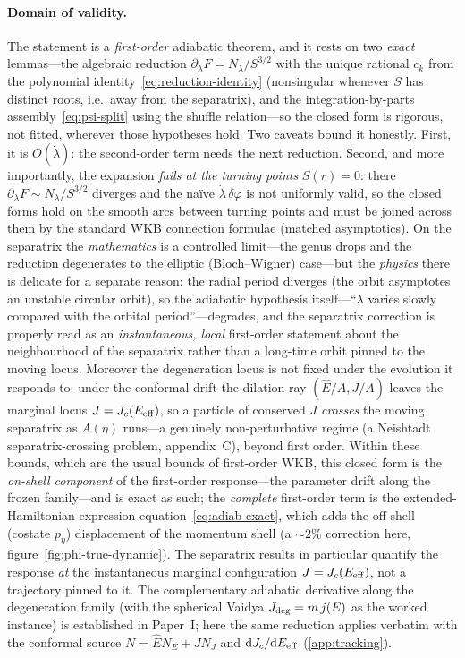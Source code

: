 \documentclass[12pt]{iopart}
\theoremstyle{plain}
\theoremstyle{definition}
\theoremstyle{remark}
\newcommand{\Ehat}{\hat E}
\newcommand{\Jc}{J_{c}}
\newcommand{\dd}{\mathrm{d}}
\begin{document}
\paragraph{Domain of validity.} The statement is a \emph{first-order} adiabatic
theorem, and it rests on two \emph{exact} lemmas---the algebraic reduction
$\partial_\lambda F=N_\lambda/S^{3/2}$ with the unique rational $c_k$ from the
polynomial identity~\eqref{eq:reduction-identity} (nonsingular whenever $S$ has
distinct roots, i.e.\ away from the separatrix), and the integration-by-parts
assembly~\eqref{eq:psi-split} using the shuffle relation---so the closed form is
rigorous, not fitted, wherever those hypotheses hold. Two caveats bound it honestly.
First, it is $O(\dot\lambda)$: the second-order term needs the next reduction.
Second, and more importantly, the expansion \emph{fails at the turning points}
$S(r)=0$: there $\partial_\lambda F\sim N_\lambda/S^{3/2}$ diverges and the na\"ive
$\dot\lambda\,\delta\varphi$ is not uniformly valid, so the closed forms hold on the
smooth arcs between turning points and must be joined across them by the standard WKB
connection formulae (matched asymptotics). On the separatrix the \emph{mathematics}
is a controlled limit---the genus drops and the reduction degenerates to the elliptic
(Bloch--Wigner) case---but the \emph{physics} there is delicate for a separate reason:
the radial period diverges (the orbit asymptotes an unstable circular orbit), so the
adiabatic hypothesis itself---``$\lambda$ varies slowly compared with the orbital
period''---degrades, and the separatrix correction is properly read as an
\emph{instantaneous, local} first-order statement about the neighbourhood of the
separatrix rather than a long-time orbit pinned to the moving locus. Moreover the degeneration
locus is not fixed under the evolution it responds to: under the conformal drift the
dilation ray $(\Ehat/A,J/A)$ leaves the marginal locus $J=\Jc(E_{\rm eff})$, so a
particle of conserved $J$ \emph{crosses} the moving separatrix as $A(\eta)$ runs---a
genuinely non-perturbative regime (a Neishtadt separatrix-crossing problem, appendix~C),
beyond first order. Within these bounds, which
are the usual bounds of first-order WKB, this closed form is the \emph{on-shell
component} of the first-order response---the parameter drift along the frozen
family---and is exact as such; the \emph{complete} first-order term is the
extended-Hamiltonian expression equation~\eqref{eq:adiab-exact}, which adds the
off-shell (costate $p_\eta$) displacement of the momentum shell (a $\sim2\%$
correction here, figure~\ref{fig:phi-true-dynamic}). The separatrix results in particular
quantify the response \emph{at} the instantaneous marginal configuration
$J=\Jc(E_{\rm eff})$, not a trajectory pinned to it. The complementary
adiabatic derivative along the degeneration family
(with the spherical Vaidya $J_{\rm deg}=m\,j(E)$ as the worked instance) is established
in Paper~I; here the same reduction applies verbatim with the conformal source
$N=\Ehat N_E+J N_J$ and $\dd\Jc/\dd E_{\rm eff}$ (\ref{app:tracking}).
\end{document}
